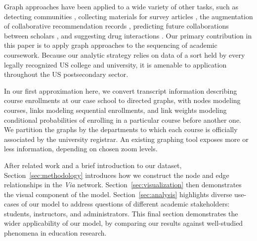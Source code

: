 Graph approaches have been applied to a wide variety of other tasks, such as detecting communities \cite{Fortunato2004}, collecting materials for survey articles \cite{ji2015}, the augmentation of collaborative recommendation records \cite{huang2005}, predicting future collaborations between scholars \cite{liben2007}, and suggesting drug interactions \cite{zitnik2018}. Our primary contribution in this paper is to apply graph approaches to the sequencing of academic coursework. Because our analytic strategy relies on data of a sort held by every legally recognized US college and university, it is amenable to application throughout the US postsecondary sector. 


In our first approximation here, we convert transcript information describing course enrollments at our case school to directed graphs, with nodes modeling courses, links modeling sequential enrollments, and link weights modeling conditional probabilities of enrolling in a particular course before another one. We partition the graphs by the departments to which each course is officially associated by the university registrar. An existing graphing tool \cite{shannon2003cytoscape} exposes more or less information, depending on chosen zoom levels.


After related work and a brief introduction to our dataset, Section~\ref{sec:methodology} introduces how we construct the node and
edge relationships in the {\em Via} network. Section~\ref{sec:visualization} then demonstrates the visual component of the model.  Section~\ref{sec:analysis} highlights diverse use-cases of our model to address questions of different academic stakeholders: students, instructors, and administrators. This final section demonstrates the wider applicability of our model, by comparing our results against well-studied phenomena in education research.


